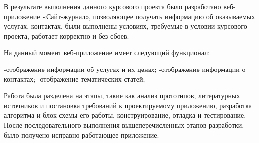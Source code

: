 \hspace{1.25cm}В результате выполнения данного курсового проекта было разработано веб-приложение «Сайт-журнал», позволяющее получать информацию об оказываемых услугах, контактах, были выполнены условиях, требуемые в условии курсового проекта, работает корректно и без сбоев.

На данный момент веб-приложение имеет следующий функционал:

-отображение информации об услугах и их ценах;
-отображение информации о контактах;
-отображение тематических статей;

Работа была разделена на этапы, такие как анализ прототипов,  литературных источников и постановка требований к проектируемому приложению, разработка алгоритма и блок-схемы его работы, конструирование, отладка и тестирование. После последовательного выполнения вышеперечисленных этапов разработки, было получено исправно работающее приложение.
